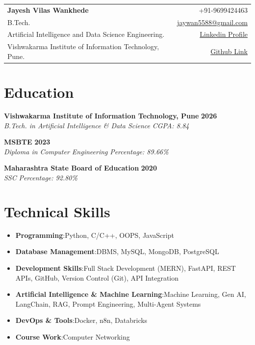 \documentclass[a4paper,11pt]{article}
\makeatletter
\newcommand{\resumeItem}[2]{
  \item{
    \textbf{#1}{:\hspace{0.5mm}#2 \vspace{-0.5mm}}
  }
}
\newcommand{\resumeSubItem}[2]{\resumeItem{#1}{#2}\vspace{-4pt}}
\newcommand{\resumeHeadingSkillStart}{\begin{itemize}[leftmargin=*,itemsep=1.7mm, rightmargin=2ex]}
\newcommand{\resumeHeadingSkillEnd}{\end{itemize}\vspace{-2mm}}
\newcommand{\name}{Jayesh Vilas Wankhede } %
\newcommand{\course}{B.Tech.} %
\newcommand{\phone}{9699424463} %
\newcommand{\emailb}{jaywan5588@gmail.com} %
\makeatother
\begin{document}
\selectfont
{%
}
\parbox{\dimexpr\linewidth-2.8cm\relax}{
\begin{tabularx}{\linewidth}{L r}
  \textbf{\LARGE \name} & +91-\phone \\
  \course & \href{mailto:\emailb}{\emailb} \\
  Artificial Intelligence and Data Science Engineering. & \href{https://www.linkedin.com/in/jayesh-wankhede-a-programmer-web-designer/}{\color{blue}Linkedin Profile } \\
  Vishwakarma Institute of Information Technology, Pune.
  & \href{https://github.com/jay-3107}{\color{blue}Github Link} \\
\end{tabularx}
}
\vspace{-2mm}


\section{Education}
\vspace{1mm}

\textbf{Vishwakarma Institute of Information Technology, Pune} \hfill \textbf{2026 } \\
\textit{B.Tech. in Artificial Intelligence \& Data Science} \hfill \textit{CGPA: 8.84} \\

\vspace{0.5mm}

\textbf{MSBTE} \hfill \textbf{2023} \\
\textit{Diploma in Computer Engineering} \hfill \textit{Percentage: 89.66\%} \\

\vspace{0.5mm}

\textbf{Maharashtra State Board of Education} \hfill \textbf{2020} \\
\textit{SSC} \hfill \textit{Percentage: 92.80\%} \\



\section{Technical Skills}
\resumeHeadingSkillStart

  \resumeSubItem{Programming}
    {Python, C/C++, OOPS, JavaScript}
  \resumeSubItem{Database Management}
    {DBMS, MySQL, MongoDB, PostgreSQL}
  \resumeSubItem{Development Skills}
    {Full Stack Development (MERN), FastAPI, REST APIs, GitHub, Version Control (Git), API Integration}
  \resumeSubItem{Artificial Intelligence \& Machine Learning}
    {Machine Learning, Gen AI, LangChain, RAG, Prompt Engineering, Multi-Agent Systems}
  \resumeSubItem{DevOps \& Tools}
    {Docker, n8n, Databricks}
  \resumeSubItem{Course Work}
    {Computer Networking}
    \vspace{-1mm} %
\resumeHeadingSkillEnd
\end{document}
